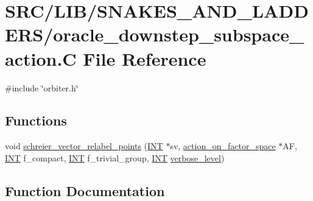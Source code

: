\hypertarget{oracle__downstep__subspace__action_8_c}{}\section{S\+R\+C/\+L\+I\+B/\+S\+N\+A\+K\+E\+S\+\_\+\+A\+N\+D\+\_\+\+L\+A\+D\+D\+E\+R\+S/oracle\+\_\+downstep\+\_\+subspace\+\_\+action.C File Reference}
\label{oracle__downstep__subspace__action_8_c}
{\ttfamily \#include \char`\"{}orbiter.\+h\char`\"{}}\newline
\subsection*{Functions}
\begin{DoxyCompactItemize}
\item 
void \mbox{\hyperlink{oracle__downstep__subspace__action_8_c_ae98947edc50a9e66619bd56a3b1bc9ec}{schreier\+\_\+vector\+\_\+relabel\+\_\+points}} (\mbox{\hyperlink{galois_8h_a09fddde158a3a20bd2dcadb609de11dc}{I\+NT}} $\ast$sv, \mbox{\hyperlink{classaction__on__factor__space}{action\+\_\+on\+\_\+factor\+\_\+space}} $\ast$AF, \mbox{\hyperlink{galois_8h_a09fddde158a3a20bd2dcadb609de11dc}{I\+NT}} f\+\_\+compact, \mbox{\hyperlink{galois_8h_a09fddde158a3a20bd2dcadb609de11dc}{I\+NT}} f\+\_\+trivial\+\_\+group, \mbox{\hyperlink{galois_8h_a09fddde158a3a20bd2dcadb609de11dc}{I\+NT}} \mbox{\hyperlink{simeon_8_c_a818073fbcc2f439e7c56952f67386122}{verbose\+\_\+level}})
\end{DoxyCompactItemize}


\subsection{Function Documentation}
\mbox{\label{oracle__downstep__subspace__action_8_c_ae98947edc50a9e66619bd56a3b1bc9ec}} 
